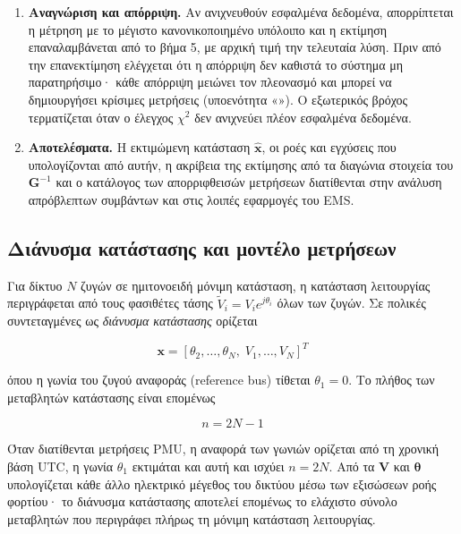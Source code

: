 \begin{enumerate}
\item \textbf{Αναγνώριση και απόρριψη.} Αν ανιχνευθούν εσφαλμένα δεδομένα, απορρίπτεται η
      μέτρηση με το μέγιστο κανονικοποιημένο υπόλοιπο και η εκτίμηση επαναλαμβάνεται από το
      βήμα 5, με αρχική τιμή την τελευταία λύση. Πριν από την επανεκτίμηση ελέγχεται ότι η
      απόρριψη δεν καθιστά το σύστημα μη παρατηρήσιμο· κάθε απόρριψη μειώνει τον πλεονασμό
      και μπορεί να δημιουργήσει κρίσιμες μετρήσεις (υποενότητα «»). Ο εξωτερικός
      βρόχος τερματίζεται όταν ο έλεγχος $\chi^2$ δεν ανιχνεύει πλέον εσφαλμένα δεδομένα.
\item \textbf{Αποτελέσματα.} Η εκτιμώμενη κατάσταση $\hat{\mathbf{x}}$, οι ροές και εγχύσεις
      που υπολογίζονται από αυτήν, η ακρίβεια της εκτίμησης από τα διαγώνια στοιχεία του
      $\mathbf{G}^{-1}$ και ο κατάλογος των απορριφθεισών μετρήσεων διατίθενται στην ανάλυση
      απρόβλεπτων συμβάντων και στις λοιπές εφαρμογές του EMS.
\end{enumerate}

\subsection{Διάνυσμα κατάστασης και μοντέλο μετρήσεων}

Για δίκτυο $N$ ζυγών σε ημιτονοειδή μόνιμη κατάσταση, η κατάσταση λειτουργίας περιγράφεται από
τους φασιθέτες τάσης $\tilde{V}_i = V_i e^{j\theta_i}$ όλων των ζυγών. Σε πολικές συντεταγμένες
ως \emph{διάνυσμα κατάστασης} ορίζεται

\begin{equation}
\mathbf{x} = \left[\theta_2, \ldots, \theta_N,\; V_1, \ldots, V_N\right]^{T}
\label{eq:statevec}
\end{equation}

όπου η γωνία του ζυγού αναφοράς (reference bus) τίθεται $\theta_1 = 0$. Το πλήθος των
μεταβλητών κατάστασης είναι επομένως

\begin{equation}
n = 2N - 1
\label{eq:nstates}
\end{equation}

Όταν διατίθενται μετρήσεις PMU, η αναφορά των γωνιών ορίζεται από τη χρονική βάση UTC, η
γωνία $\theta_1$ εκτιμάται και αυτή και ισχύει $n = 2N$. Από τα $\mathbf{V}$ και
$\boldsymbol{\theta}$ υπολογίζεται κάθε άλλο ηλεκτρικό μέγεθος του δικτύου μέσω των εξισώσεων
ροής φορτίου· το διάνυσμα κατάστασης αποτελεί επομένως το ελάχιστο σύνολο μεταβλητών που
περιγράφει πλήρως τη μόνιμη κατάσταση λειτουργίας.

